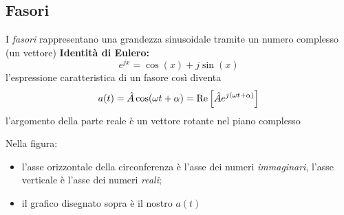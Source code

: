 \documentclass{article}
\begin{document}
\subsection{Fasori}
I \textit{fasori} rappresentano una grandezza sinusoidale tramite un numero complesso (un vettore)
\textbf{Identità di Eulero:}
\[
    e^{jx} = \cos(x) + j\sin(x)
\]
l'espressione caratteristica di un fasore così diventa
\[
    a(t)=\hat A \cos(\omega t + \alpha) = \text{Re}\left[\hat A e^{j(\omega t + \alpha)}\right]
\]
l'argomento della parte reale è un vettore rotante nel piano complesso
\begin{center}
\end{center}
Nella figura:
\begin{itemize}
    \item l'asse orizzontale della circonferenza è l'asse dei numeri \textit{immaginari}, l'asse verticale è l'asse dei numeri \textit{reali};
    \item il grafico disegnato sopra è il nostro $a(t)$
\end{itemize}
\end{document}
